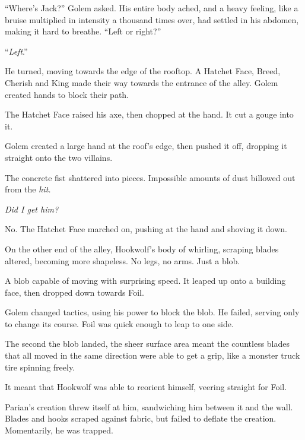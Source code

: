 ``Where's Jack?'' Golem asked.  His entire body ached, and a heavy feeling, like a bruise multiplied in intensity a thousand times over, had settled in his abdomen, making it hard to breathe.  ``Left or right?''



``\emph{Left}.''



He turned, moving towards the edge of the rooftop.  A Hatchet Face, Breed, Cherish and King made their way towards the entrance of the alley.  Golem created hands to block their path.



The Hatchet Face raised his axe, then chopped at the hand.  It cut a gouge into it.



Golem created a large hand at the roof's edge, then pushed it off, dropping it straight onto the two villains.



The concrete fist shattered into pieces.  Impossible amounts of dust billowed out from the \emph{hit.}



\emph{Did I get him?}



No.  The Hatchet Face marched on, pushing at the hand and shoving it down.



On the other end of the alley, Hookwolf's body of whirling, scraping blades altered, becoming more shapeless.  No legs, no arms.  Just a blob.



A blob capable of moving with surprising speed.  It leaped up onto a building face, then dropped down towards Foil.



Golem changed tactics, using his power to block the blob.  He failed, serving only to change its course.  Foil was quick enough to leap to one side.



The second the blob landed, the sheer surface area meant the countless blades that all moved in the same direction were able to get a grip, like a monster truck tire spinning freely.



It meant that Hookwolf was able to reorient himself, veering straight for Foil.



Parian's creation threw itself at him, sandwiching him between it and the wall.  Blades and hooks scraped against fabric, but failed to deflate the creation.  Momentarily, he was trapped.



